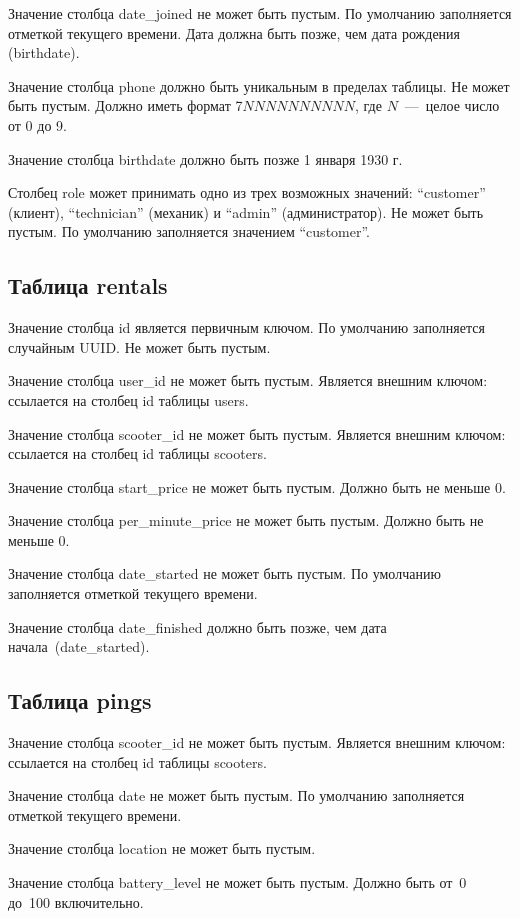 Значение столбца date\_joined не может быть пустым. По умолчанию заполняется отметкой текущего времени. Дата должна быть позже, чем дата рождения (birthdate).

Значение столбца phone должно быть уникальным в пределах таблицы. Не может быть пустым. Должно иметь формат 7$NNNNNNNNNN$, где $N$~---~целое число от 0 до 9.

Значение столбца birthdate должно быть позже 1 января 1930 г.

Столбец role может принимать одно из трех возможных значений: \enquote{customer} (клиент), \enquote{technician} (механик) и \enquote{admin} (администратор). Не может быть пустым. По умолчанию заполняется значением \enquote{customer}.

\subsection*{Таблица rentals}

Значение столбца id является первичным ключом. По умолчанию заполняется случайным UUID. Не может быть пустым.

Значение столбца user\_id не может быть пустым. Является внешним ключом: ссылается на столбец id таблицы users.

Значение столбца scooter\_id не может быть пустым. Является внешним ключом: ссылается на столбец id таблицы scooters.

Значение столбца start\_price не может быть пустым. Должно быть не меньше 0.

Значение столбца per\_minute\_price не может быть пустым. Должно быть не меньше 0.

Значение столбца date\_started не может быть пустым. По умолчанию заполняется отметкой текущего времени.

Значение столбца date\_finished должно быть позже, чем дата начала~(date\_started).

\subsection*{Таблица pings}

Значение столбца scooter\_id не может быть пустым. Является внешним ключом: ссылается на столбец id таблицы scooters.

Значение столбца date не может быть пустым. По умолчанию заполняется отметкой текущего времени.

Значение столбца location не может быть пустым.

Значение столбца battery\_level не может быть пустым. Должно быть от~0 до~100 включительно.

